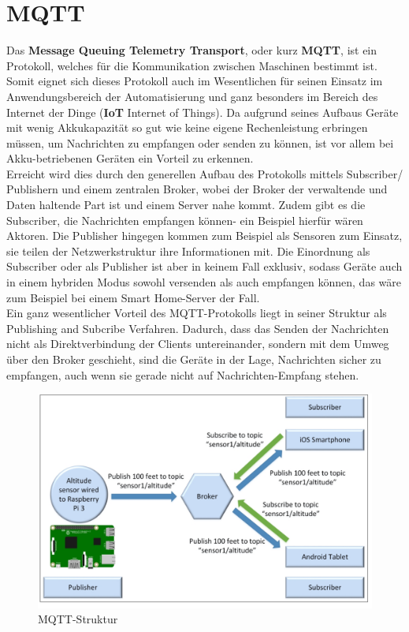 \section{MQTT}
Das \textbf{Message Queuing Telemetry Transport}, oder kurz \textbf{MQTT}, ist ein Protokoll, welches für die Kommunikation zwischen Maschinen bestimmt ist. Somit eignet sich dieses Protokoll auch im Wesentlichen für seinen Einsatz im Anwendungsbereich der Automatisierung und ganz besonders im Bereich des Internet der Dinge (\textbf{IoT} Internet of Things). Da aufgrund seines Aufbaus Geräte mit wenig Akkukapazität so gut wie keine eigene Rechenleistung erbringen müssen, um Nachrichten zu empfangen oder senden zu können, ist vor allem bei Akku-betriebenen Geräten ein Vorteil zu erkennen.\\
Erreicht wird dies durch den generellen Aufbau des Protokolls mittels Subscriber/ Publishern und einem zentralen Broker, wobei der Broker der verwaltende und Daten haltende Part ist und einem Server nahe kommt. Zudem gibt es die Subscriber, die Nachrichten empfangen können- ein Beispiel hierfür wären Aktoren. Die Publisher hingegen kommen zum Beispiel als Sensoren zum Einsatz, sie teilen der Netzwerkstruktur ihre Informationen mit. Die Einordnung als Subscriber oder als Publisher ist aber in keinem Fall exklusiv, sodass Geräte auch in einem hybriden Modus sowohl versenden als auch empfangen können, das wäre zum Beispiel bei einem Smart Home-Server der Fall.\\
 Ein ganz wesentlicher Vorteil des MQTT-Protokolls liegt in seiner Struktur als Publishing and Subcribe Verfahren. Dadurch, dass das Senden der Nachrichten nicht als Direktverbindung der Clients untereinander, sondern mit dem Umweg über den Broker geschieht, sind die Geräte in der Lage, Nachrichten sicher zu empfangen, auch wenn sie gerade nicht auf Nachrichten-Empfang stehen.\cite{b1}
 
 \begin{figure}[h]
 \caption{MQTT-Struktur \cite{b1}}
 \centering
 \includegraphics[scale=0.4]{mqtt_structure}
 \end{figure}
 
